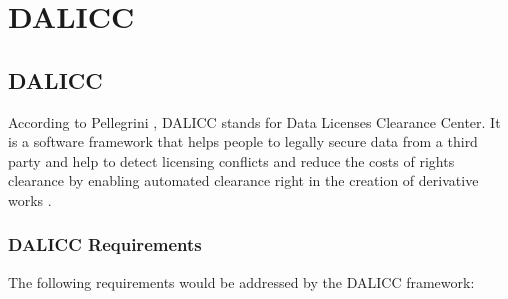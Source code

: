 \chapter{DALICC}
\section{DALICC}
According to Pellegrini \cite{Tassilo}, DALICC stands for Data Licenses Clearance Center. It is a software framework that helps people to legally secure data from a third party and help to detect licensing conflicts and reduce the costs of rights clearance by enabling automated clearance right in the creation of derivative works \cite{Tassilo}. 
\subsection{DALICC Requirements}
The following requirements would be addressed by the DALICC framework:\\
